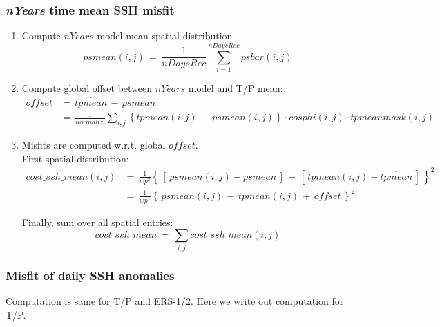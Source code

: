 \subsubsection{\textit{\textbf{nYears}} time mean SSH misfit}

\begin{enumerate}
%
\item
Compute $nYears$ model mean spatial distribution
%
\begin{equation}
psmean(i,j)\, =\, 
\frac{1}{nDaysRec} \sum_{i=1}^{nDaysRec}
psbar(i,j)
\end{equation}
%
\item
Compute global offset between $nYears$ model and T/P mean:
%
\begin{equation}
\begin{aligned}
offset & = \, \overline{tpmean} \, - \, \overline{psmean} \\
~ & = \, \frac{1}{normaliz.} \sum_{i,j}
\left\{ tpmean(i,j) \, - \, psmean(i,j) \right\} 
\cdot cosphi(i,j) \cdot tpmeanmask(i,j)
\end{aligned}
\end{equation}
%
\item
Misfits are computed w.r.t. global $offset$. 
\\
First spatial distribution:
%
\begin{equation}
\begin{aligned}
cost\_ssh\_mean(i,j) & = \,
\frac{1}{wp^2} \left\{ \,
\left[ \, psmean(i,j) - \overline{psmean} \, \right] \, - \,
\left[ \, tpmean(i,j) - \overline{tpmean} \, \right] \, \right\}^2 \\ 
~ & = \, \frac{1}{wp^2} \left\{ \,
psmean(i,j) \, - \, tpmean(i,j) \, + \, offset \, \right\}^2
\end{aligned}
\end{equation}

%
Finally, sum over all spatial entries:
\begin{equation}
\overline{cost\_ssh\_mean} \, = \,
\sum_{i,j} cost\_ssh\_mean(i,j)
\end{equation}



\end{enumerate}

\subsubsection{Misfit of daily SSH anomalies}

Computation is same for T/P and ERS-1/2.
Here we write out computation for T/P.


